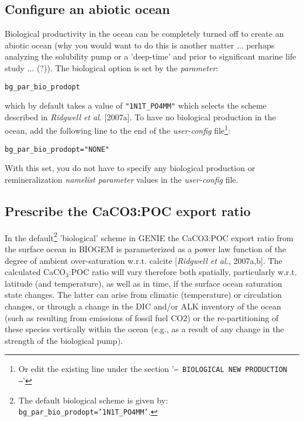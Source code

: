 %
\subsection*{Configure an abiotic ocean}
\vspace{1mm}

Biological productivity in the ocean can be completely turned off to create an abiotic ocean (why you would want to do this is another matter ... perhaps analyzing the solubility pump or a 'deep-time' and prior to significant marine life study ... (?)). The biological option is set by the \textit{parameter}:
\vspace{-5mm}\small\begin{verbatim}
bg_par_bio_prodopt
\end{verbatim}\vspace{-1mm}\normalsize
 which by default takes a value of \texttt{"1N1T\_PO4MM"} which selects the scheme described in \textit{Ridgwell et al.} [2007a]. To have no biological production in the ocean, add the following line to the end of the \textit{user-config} file\footnote{Or edit the existing line under the section '\texttt{--- BIOLOGICAL NEW PRODUCTION ---}'}:
\vspace{-2mm}\small\begin{verbatim}
bg_par_bio_prodopt="NONE"
\end{verbatim}\normalsize\vspace{-2mm}
With this set, you do not have to specify any biological production or remineralization \textit{namelist parameter} values in the \textit{user-config} file.

%
\newpage
\subsection*{Prescribe the CaCO3:POC export ratio}
\vspace{1mm}

In the default\footnote{The default biological scheme is given by: \texttt{bg\_par\_bio\_prodopt='1N1T\_PO4MM'}.} 'biological' scheme in GENIE the CaCO3:POC export ratio from the surface ocean in BIOGEM is parameterized as a power law function of the degree of ambient over-saturation w.r.t. calcite [\textit{Ridgwell et al.}, 2007a,b]. The calculated CaCO\begin{math}_3\end{math}:POC ratio will vary therefore both spatially, particularly w.r.t. latitude (and temperature), as well as in time, if the surface ocean saturation state changes. The latter can arise from climatic (temperature) or circulation changes, or through a change in the DIC and/or ALK inventory of the ocean (such as resulting from emissions of fossil fuel CO2) or the re-partitioning of these species vertically within the ocean (e.g., as a result of any change in the strength of the biological pump).

